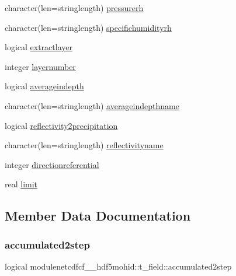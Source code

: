 \begin{DoxyCompactItemize}
character(len=stringlength) \mbox{\hyperlink{structmodulenetcdfcf__2__hdf5mohid_1_1t__field_a4cce5c70a0083a95dde89e2cd38c6232}{pressurerh}}
\item 
character(len=stringlength) \mbox{\hyperlink{structmodulenetcdfcf__2__hdf5mohid_1_1t__field_a96449c3a4fbd8aab7be474660a1fb0f8}{specifichumidityrh}}
\item 
logical \mbox{\hyperlink{structmodulenetcdfcf__2__hdf5mohid_1_1t__field_a28afa7958f7fe840bbe15cb39f4256f9}{extractlayer}}
\item 
integer \mbox{\hyperlink{structmodulenetcdfcf__2__hdf5mohid_1_1t__field_afae984c1936a07ba1a94eb0df484b55d}{layernumber}}
\item 
logical \mbox{\hyperlink{structmodulenetcdfcf__2__hdf5mohid_1_1t__field_ad607d86b419fe7040da22e45ca74b21d}{averageindepth}}
\item 
character(len=stringlength) \mbox{\hyperlink{structmodulenetcdfcf__2__hdf5mohid_1_1t__field_ae9897467765b555e3fa150f5ab893383}{averageindepthname}}
\item 
logical \mbox{\hyperlink{structmodulenetcdfcf__2__hdf5mohid_1_1t__field_a0e7d6dcd548681bc3221c1d4c51d653c}{reflectivity2precipitation}}
\item 
character(len=stringlength) \mbox{\hyperlink{structmodulenetcdfcf__2__hdf5mohid_1_1t__field_ad6f92dee4c4186bf108df723e07c643e}{reflectivityname}}
\item 
integer \mbox{\hyperlink{structmodulenetcdfcf__2__hdf5mohid_1_1t__field_adba8db64a761822fe281a9c25f4bec94}{directionreferential}}
\item 
real \mbox{\hyperlink{structmodulenetcdfcf__2__hdf5mohid_1_1t__field_ab703b11035dd7191885e6290da9aaa15}{limit}}
\end{DoxyCompactItemize}


\subsection{Member Data Documentation}
\mbox{\label{structmodulenetcdfcf__2__hdf5mohid_1_1t__field_ae9fa1026383d344758444e98bbbb638e}} 
\subsubsection{\texorpdfstring{accumulated2step}{accumulated2step}}
{\footnotesize\ttfamily logical modulenetcdfcf\+\_\+\_\+hdf5mohid\+::t\+\_\+field\+::accumulated2step\hspace{0.3cm}{\ttfamily [private]}}

